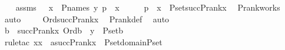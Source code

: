 \begin{isabellebody}
\ \ \isamarkupfalse%
\ assms\ {\isacharcolon}{\kern0pt}\ \ {\isachardoublequoteopen}x\ {\isasymin}\ P{\isacharunderscore}{\kern0pt}names{\isachardoublequoteclose}\ {\isachardoublequoteopen}{\isacharless}{\kern0pt}y{\isacharcomma}{\kern0pt}\ p{\isachargreater}{\kern0pt}\ {\isasymin}\ x{\isachardoublequoteclose}\isanewline
\ \ \isamarkupfalse%
\ \isamarkupfalse%
\ p{}\ {\isacharcolon}{\kern0pt}\ {\isachardoublequoteopen}x\ {\isasymin}\ P{\isacharunderscore}{\kern0pt}set{\isacharparenleft}{\kern0pt}succ{\isacharparenleft}{\kern0pt}P{\isacharunderscore}{\kern0pt}rank{\isacharparenleft}{\kern0pt}x{\isacharparenright}{\kern0pt}{\isacharparenright}{\kern0pt}{\isacharparenright}{\kern0pt}{\isachardoublequoteclose}\ \isamarkupfalse%
\ P{\isacharunderscore}{\kern0pt}rank{\isacharunderscore}{\kern0pt}works\ \isamarkupfalse%
\ auto\ \isanewline
\ \ \isamarkupfalse%
\ {\isachardoublequoteopen}Ord{\isacharparenleft}{\kern0pt}succ{\isacharparenleft}{\kern0pt}P{\isacharunderscore}{\kern0pt}rank{\isacharparenleft}{\kern0pt}x{\isacharparenright}{\kern0pt}{\isacharparenright}{\kern0pt}{\isacharparenright}{\kern0pt}{\isachardoublequoteclose}\ \isamarkupfalse%
\ P{\isacharunderscore}{\kern0pt}rank{\isacharunderscore}{\kern0pt}def\ \isamarkupfalse%
\ auto\ \isanewline
\ \ \isamarkupfalse%
\ \isamarkupfalse%
\ {\isachardoublequoteopen}{\isasymexists}b\ {\isacharless}{\kern0pt}\ succ{\isacharparenleft}{\kern0pt}P{\isacharunderscore}{\kern0pt}rank{\isacharparenleft}{\kern0pt}x{\isacharparenright}{\kern0pt}{\isacharparenright}{\kern0pt}{\isachardot}{\kern0pt}\ Ord{\isacharparenleft}{\kern0pt}b{\isacharparenright}{\kern0pt}\ {\isasymand}\ y\ {\isasymin}\ P{\isacharunderscore}{\kern0pt}set{\isacharparenleft}{\kern0pt}b{\isacharparenright}{\kern0pt}{\isachardoublequoteclose}\isanewline
\ \ \ \ \isamarkupfalse%
\ {\isacharparenleft}{\kern0pt}rule{\isacharunderscore}{\kern0pt}tac\ x{\isacharequal}{\kern0pt}x\ \ a{\isacharequal}{\kern0pt}{\isachardoublequoteopen}succ{\isacharparenleft}{\kern0pt}P{\isacharunderscore}{\kern0pt}rank{\isacharparenleft}{\kern0pt}x{\isacharparenright}{\kern0pt}{\isacharparenright}{\kern0pt}{\isachardoublequoteclose}\ \ P{\isacharunderscore}{\kern0pt}set{\isacharunderscore}{\kern0pt}domain{\isacharunderscore}{\kern0pt}P{\isacharunderscore}{\kern0pt}set{\isacharparenright}{\kern0pt}\isanewline
\ \ \ \ \isamarkupfalse%

\end{isabellebody}
